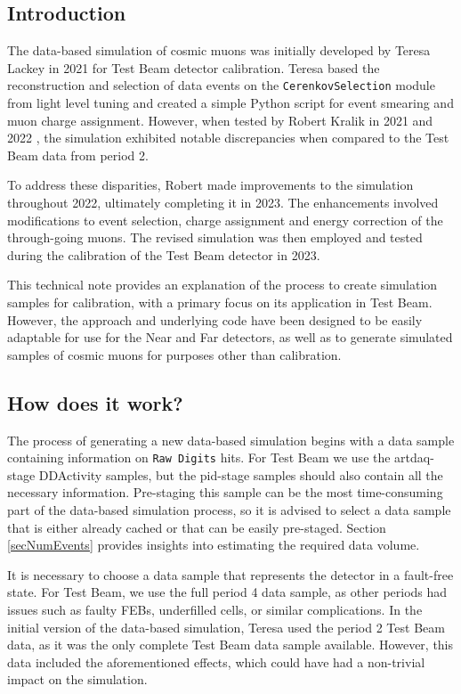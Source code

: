 \subsection{Introduction}
The data-based simulation of cosmic muons was initially developed by Teresa Lackey \cite{LackeyThesis} in 2021 for Test Beam detector calibration. Teresa based the reconstruction and selection of data events on the \texttt{CerenkovSelection} module from light level tuning and created a simple Python script for event smearing and muon charge assignment. However, when tested by Robert Kralik in 2021 and 2022 \cite{NOVA-doc-54417-v1}, the simulation exhibited notable discrepancies when compared to the Test Beam data from period 2.

To address these disparities, Robert made improvements to the simulation throughout 2022, ultimately completing it in 2023. The enhancements involved modifications to event selection, charge assignment and energy correction of the through-going muons. The revised simulation was then employed and tested during the calibration of the Test Beam detector in 2023.

This technical note provides an explanation of the process to create simulation samples for calibration, with a primary focus on its application in Test Beam. However, the approach and underlying code have been designed to be easily adaptable for use for the Near and Far detectors, as well as to generate simulated samples of cosmic muons for purposes other than calibration.

\subsection{How does it work?}

The process of generating a new data-based simulation begins with a data sample containing information on \texttt{Raw Digits} hits. For Test Beam we use the artdaq-stage DDActivity samples, but the pid-stage samples should also contain all the necessary information. Pre-staging this sample can be the most time-consuming part of the data-based simulation process, so it is advised to select a data sample that is either already cached or that can be easily pre-staged. Section \ref{secNumEvents} provides insights into estimating the required data volume.

It is necessary to choose a data sample that represents the detector in a fault-free state. For Test Beam, we use the full period 4 data sample, as other periods had issues such as faulty FEBs, underfilled cells, or similar complications. In the initial version of the data-based simulation, Teresa used the period 2 Test Beam data, as it was the only complete Test Beam data sample available. However, this data included the aforementioned effects, which could have had a non-trivial impact on the simulation.


